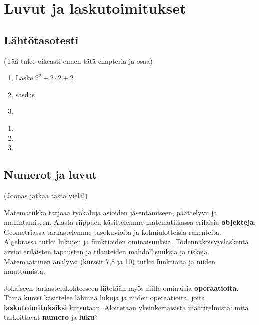 
\part{Luvut ja laskutoimitukset}
\chapter{Lähtötasotesti}

(Tää tulee oikeasti ennen tätä chapteria ja osaa)

\begin{tehtava}
\begin{enumerate}
\item Laske $2^2+2 \cdot 2+2$
\item sasdas
\item 
\end{enumerate}

\begin{vastaus}
\begin{enumerate}
\item 
\item
\item

\end{enumerate}
\end{vastaus}
\end{tehtava}
\chapter{Numerot ja luvut}

(Joonas jatkaa tästä vielä!)

Matematiikka tarjoaa työkaluja asioiden jäsentämiseen, päättelyyn ja mallintamiseen. Alasta riippuen käsittelemme matematiikassa erilaisia \textbf{objekteja}: Geometriassa tarkastelemme tasokuvioita ja kolmiulotteisia rakenteita. Algebrassa tutkii lukujen ja funktioiden ominaisuuksia. Todennäköisyyslaskenta arvioi erilaisten tapausten ja tilanteiden mahdollisuuksia ja riskejä. Matemaattinen analyysi (kurssit 7,8 ja 10) tutkii funktioita ja niiden muuttumista.

Jokaiseen tarkastelukohteeseen liitetään myös niille ominaisia \textbf{operaatioita}. Tämä kurssi käsittelee lähinnä lukuja ja niiden operaatioita, joita \textbf{laskutoimituksiksi} kutsutaan. Aloitetaan yksinkertaisista määritelmistä: mitä tarkoittavat \textbf{numero} ja \textbf{luku}?



